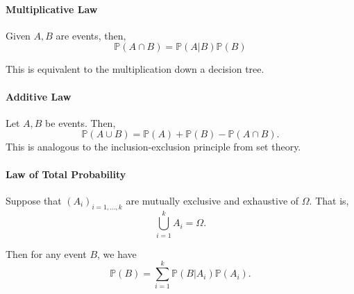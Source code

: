 \paragraph{Multiplicative Law}
Given \(A, B\) are events, then,
\[
    \mathbb{P}(A \cap B) = \mathbb{P}(A | B) \mathbb{P}(B)
\]

This is equivalent to the multiplication down a decision tree.

\paragraph{Additive Law}
Let \(A, B\) be events. Then, \[
    \mathbb{P}(A\cup B) = \mathbb{P}(A) + \mathbb{P}(B) - \mathbb{P}(A \cap B).
\]
This is analogous to the inclusion-exclusion principle from set theory.


\paragraph{Law of Total Probability}
Suppose that \((A_i)_{i = 1, \dots, k}\) are mutually exclusive and
exhaustive of \(\Omega\).
That is, \[
    \bigcup_{i=1}^k A_i = \Omega.
\]

Then for any event \(B\), we have
\[
    \mathbb{P}(B) = \sum_{i=1}^k \mathbb{P}(B | A_i) \mathbb{P}(A_i).
\]
